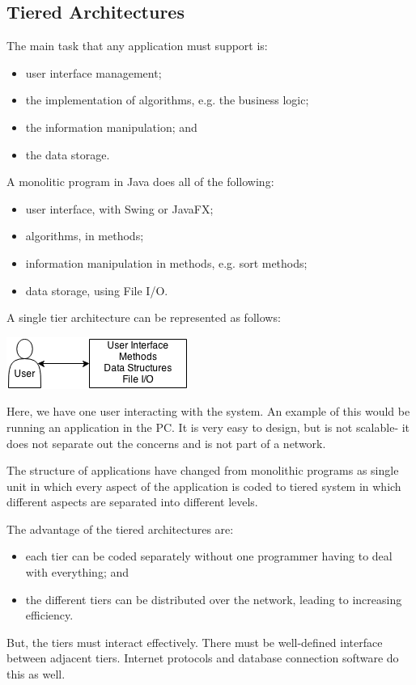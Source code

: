 \documentclass[a4paper, openany]{memoir}
\begin{document}
\subsection{Tiered Architectures}
The main task that any application must support is:
\begin{itemize}
    \item user interface management;
    \item the implementation of algorithms, e.g. the business logic;
    \item the information manipulation; and
    \item the data storage.
\end{itemize}
A monolitic program in Java does all of the following:
\begin{itemize}
    \item user interface, with Swing or JavaFX;
    \item algorithms, in methods;
    \item information manipulation in methods, e.g. sort methods;
    \item data storage, using File I/O.
\end{itemize}
A single tier architecture can be represented as follows:
\begin{center}
    \includegraphics[scale=0.8]{src/L7I1.png}
\end{center}
Here, we have one user interacting with the system. An example of this would be running an application in the PC. It is very easy to design, but is not scalable- it does not separate out the concerns and is not part of a network.

The structure of applications have changed from monolithic programs as single unit in which every aspect of the application is coded to tiered system in which different aspects are separated into different levels.

The advantage of the tiered architectures are:
\begin{itemize}
    \item each tier can be coded separately without one programmer having to deal with everything; and
    \item the different tiers can be distributed over the network, leading to increasing efficiency.
\end{itemize}
But, the tiers must interact effectively. There must be well-defined interface between adjacent tiers. Internet protocols and database connection software do this as well.
\end{document}
